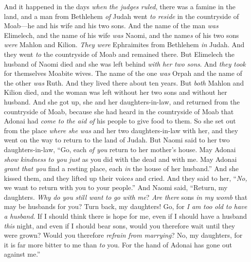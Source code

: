 
\begin{biblechapter} %
 And it happened in the days \textit{when} \textit{the judges ruled}, there was a famine in the land, and a man from Bethlehem \textit{of} Judah went \textit{to reside} in the countryside of Moab—he and his wife and his two sons.
\verse And the name of the man \textit{was} Elimelech, and the name of his wife \textit{was} Naomi, and the name\textit{s} of his two sons \textit{were} Mahlon and Kilion. \textit{They were} Ephraimites from Bethlehem \textit{in} Judah. And they went \textit{to} the countryside of Moab and remained there.
\verse But Elimelech the husband of Naomi died and she was left behind \textit{with} \textit{her two sons}.
\verse And \textit{they took} for themselves Moabite wives. The name of the one \textit{was} Orpah and the name of the other \textit{was} Ruth. And they lived there about ten years.
\verse But \textit{both} Mahlon and Kilion died, and the woman was left without her two sons and without her husband.
 And she got up, she and her daughters-in-law, and returned from the countryside of Moab, because she had heard in the countryside of Moab that Adonai had \textit{come to the aid of} his people to give food to them.
\verse So she set out from the place \textit{where she was} and her two daughters-in-law with her, and they went on the way to return to the land of Judah.
\verse But Naomi said to her two daughters-in-law, “Go, each \textit{of you} return to her mother’s house. May Adonai \textit{show kindness to you} \textit{just} as you did with the dead and with me.
\verse May Adonai \textit{grant that you} find a resting place, each \textit{in} the house of her husband.” And she kissed them, and they lifted up their voice\textit{s} and cried.
\verse And they said to her, “\textit{No,} we want to return with you to your people.”
\verse And Naomi said, “Return, my daughters. \textit{Why do you still want to go with me}? \textit{Are there} sons \textit{in my womb} that may be husbands for you?
\verse Turn back, my daughters! Go, for \textit{I am too old to have a husband}. If I should think there is hope for me, even if I should have a husband \textit{this} night, and even if I should bear sons,
\verse would you therefore wait until they were grown? Would you therefore \textit{refrain from marrying}? No, my daughters, for it is far more bitter to me than \textit{to} you. For the hand of Adonai has gone out against me.”

\end{biblechapter}
